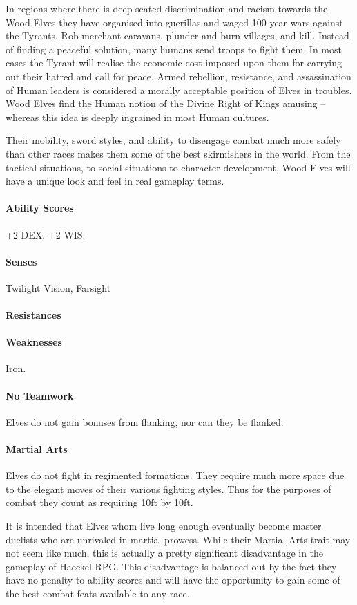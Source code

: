 \begin{multicols}{2}
In regions where there is deep seated discrimination and racism towards the Wood Elves they have organised into guerillas and waged 100 year wars against the Tyrants. Rob merchant caravans, plunder and burn villages, and kill. Instead of finding a peaceful solution, many humans send troops to fight them. In most cases the Tyrant will realise the economic cost imposed upon them for carrying out their hatred and call for peace. Armed rebellion, resistance, and assassination of Human leaders is considered a morally acceptable position of Elves in troubles. Wood Elves find the Human notion of the Divine Right of Kings amusing – whereas this idea is deeply ingrained in most Human cultures. 

Their mobility, sword styles, and ability to disengage combat much more safely than other races makes them some of the best skirmishers in the world. From the tactical situations, to social situations to character development, Wood Elves will have a unique look and feel in real gameplay terms.

\paragraph{Ability Scores} +2 DEX, +2 WIS.
\paragraph{Senses} Twilight Vision, Farsight
\paragraph{Resistances} 
\paragraph{Weaknesses} Iron. 

\paragraph{No Teamwork} Elves do not gain bonuses from flanking, nor can they be flanked.

\paragraph{Martial Arts} Elves do not fight in regimented formations. They require much more space due to the elegant moves of their various fighting styles. Thus for the purposes of combat they count as requiring 10ft by 10ft.  

\begin{framed}\centering
It is intended that Elves whom live long enough eventually become master duelists who are unrivaled in martial prowess. While their Martial Arts trait may not seem like much, this is actually a pretty significant disadvantage in the gameplay of Haeckel RPG. This disadvantage is balanced out by the fact they have no penalty to ability scores and will have the opportunity to gain some of the best combat feats available to any race.   
\end{framed}

\end{multicols}

